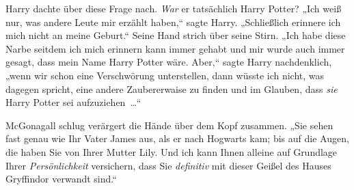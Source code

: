Harry dachte über diese Frage nach. \emph{War} er tatsächlich Harry Potter? „Ich weiß nur, was andere Leute mir erzählt haben,“ sagte Harry. „Schließlich erinnere ich mich nicht an meine Geburt.“ Seine Hand strich über seine Stirn. „Ich habe diese Narbe seitdem ich mich erinnern kann immer gehabt und mir wurde auch immer gesagt, dass mein Name Harry Potter wäre. Aber,“ sagte Harry nachdenklich, „wenn wir schon eine Verschwörung unterstellen, dann wüsste ich nicht, was dagegen spricht, eine andere Zaubererwaise zu finden und im Glauben, dass \emph{sie} Harry Potter sei aufzuziehen …“

McGonagall schlug verärgert die Hände über dem Kopf zusammen. „Sie sehen fast genau wie Ihr Vater James aus, als er nach Hogwarts kam; bis auf die Augen, die haben Sie von Ihrer Mutter Lily. Und ich kann Ihnen alleine auf Grundlage Ihrer \emph{Persönlichkeit} versichern, dass Sie \emph{definitiv} mit dieser Geißel des Hauses Gryffindor verwandt sind.“

